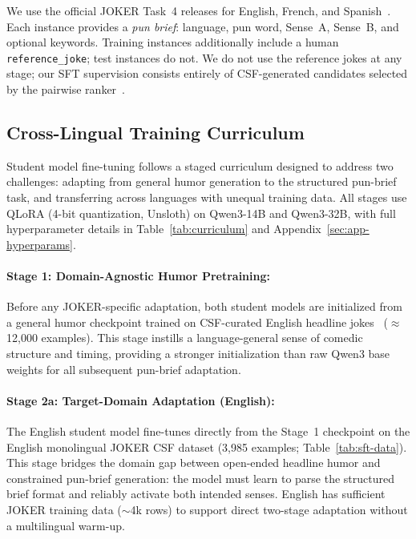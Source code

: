 \documentclass[]{ceurart}
\begin{document}
We use the official JOKER Task~4 releases for English, French, and
Spanish~\cite{ermakova2026jokertrack,kuzmin2026task4}.
Each instance provides a \emph{pun brief}: language, pun word, Sense~A,
Sense~B, and optional keywords.
Training instances additionally include a human \texttt{reference\_joke};
test instances do not.
We do not use the reference jokes at any stage; our SFT supervision consists
entirely of CSF-generated candidates selected by the pairwise ranker~\cite{ajayi2026humorrank}.

\subsection{Cross-Lingual Training Curriculum}
\label{sec:training-config}

Student model fine-tuning follows a staged curriculum designed to address two
challenges: adapting from general humor generation to the structured pun-brief
task, and transferring across languages with unequal training data.
All stages use QLoRA (4-bit quantization, Unsloth) on Qwen3-14B and Qwen3-32B,
with full hyperparameter details in Table~\ref{tab:curriculum} and
Appendix~\ref{sec:app-hyperparams}.

\paragraph{Stage 1: Domain-Agnostic Humor Pretraining:}
Before any JOKER-specific adaptation, both student models are initialized
from a general humor checkpoint trained on CSF-curated English headline
jokes~\cite{ajayi2026humorgen,semeval2026mwahaha} ($\approx$12{,}000 examples).
This stage instills a language-general sense of comedic structure and
timing, providing a stronger initialization than raw Qwen3 base weights
for all subsequent pun-brief adaptation.

\paragraph{Stage 2a: Target-Domain Adaptation (English):}
The English student model fine-tunes directly from the Stage~1 checkpoint
on the English monolingual JOKER CSF dataset (3,985 examples;
Table~\ref{tab:sft-data}).
This stage bridges the domain gap between open-ended headline humor and
constrained pun-brief generation: the model must learn to parse the
structured brief format and reliably activate both intended senses.
English has sufficient JOKER training data ($\sim$4k rows) to support
direct two-stage adaptation without a multilingual warm-up.
\end{document}
